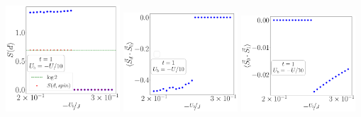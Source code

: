 \begin{center}
	\includegraphics[width=0.32\textwidth]{../figures/EE-d-D=1000.00000,t=1.00000,J=30.00000,V=1.50000J,Ub=-Uby10,N=4,U=59.85787,93.55363,25.pdf}
	\includegraphics[width=0.32\textwidth]{../figures/corr-d0-D=1000.00000,t=1.00000,J=30.00000,V=1.50000J,Ub=-Uby10,N=4,U=59.85787,93.55363,25.pdf}
	\includegraphics[width=0.32\textwidth]{../figures/r-vec-corr-01-D=1000.00000,t=1.00000,J=30.00000,V=1.50000J,Ub=-Uby10,N=4,U=59.85787,93.55363,25.pdf}
\end{center}

